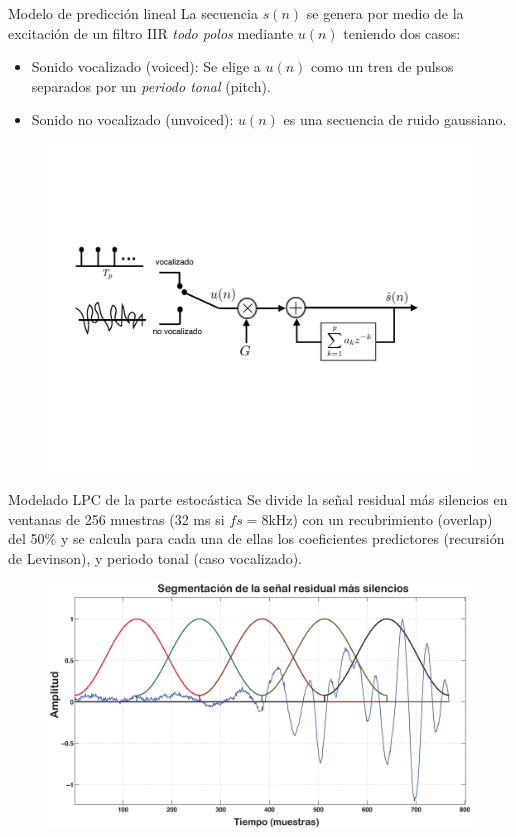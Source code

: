 \documentclass[xcolor=table]{beamer}
\begin{document}
\begin{frame}{Modelo de predicci\'on lineal}
	La secuencia $s(n)$ se genera por medio de la excitaci\'on de un filtro IIR \emph{todo polos} mediante $u(n)$ teniendo dos casos:
	\begin{itemize}
		\item<2-> Sonido vocalizado (voiced): Se elige a $u(n)$ como un tren de pulsos separados por un \emph{periodo tonal} (pitch).
		\item<3-> Sonido no vocalizado (unvoiced): $u(n)$ es una secuencia de ruido gaussiano.
	\end{itemize}\pause
	\begin{figure}
		\centering
		\includegraphics[scale=0.4]{lpc_syn.pdf}
	\end{figure}
\end{frame}

\begin{frame}{Modelado LPC de la parte estoc\'astica}
	Se divide la se\~nal residual m\'as silencios en ventanas de 256 muestras (32 ms si $fs=8$kHz) con un recubrimiento (overlap) del 50\% y se calcula para cada una de ellas los coeficientes predictores (recursi\'on de Levinson), y periodo tonal (caso vocalizado).
	\begin{figure}
		\centering
		\includegraphics[scale=0.25]{OLA_plot.eps}
	\end{figure}
\end{frame}
\end{document}
